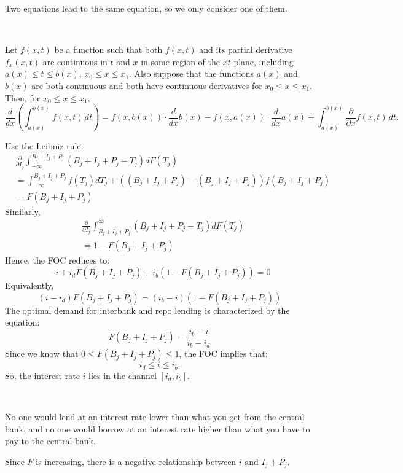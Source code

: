 Two equations lead to the same equation, so we only consider one of them.
\begin{theorem}
    \ 
    
    Let $f(x, t)$ be a function such that both $f(x, t)$ and 
    its partial derivative $f_x(x, t)$ are continuous in $t$ and 
    $x$ in some region of the $xt$-plane, 
    including $a(x) \leq t \leq b(x)$, $x_0 \leq x \leq x_1$. 
    Also suppose that the functions $a(x)$ and $b(x)$ are both continuous 
    and both have continuous derivatives for $x_0 \leq x \leq x_1$. 
    Then, for $x_0 \leq x \leq x_1$,
    \[
    \frac{d}{dx} \left( \int_{a(x)}^{b(x)} f(x, t) \, dt \right) = f(x, b(x)) \cdot \frac{d}{dx} b(x) - f(x, a(x)) \cdot \frac{d}{dx} a(x) + \int_{a(x)}^{b(x)} \frac{\partial}{\partial x} f(x, t) \, dt.
    \]
\end{theorem}

Use the Leibniz rule:
\begin{align*}
    & \frac{\partial}{\partial I_j} \int_{-\infty}^{B_j + I_j + P_j} (B_j + I_j + P_j - T_j) dF(T_j) \\
    &= \int_{-\infty}^{B_j + I_j + P_j} f(T_j)d T_j + \left((B_j + I_j + P_j) - (B_j + I_j + P_j)\right)f(B_j + I_j + P_j) \\
    &= F(B_j + I_j + P_j) 
\end{align*}
Similarly,
\begin{align*}
    & \frac{\partial}{\partial I_j} \int_{B_j + I_j + P_j}^{\infty} (B_j + I_j + P_j - T_j) dF(T_j) \\
    &= 1 - F(B_j + I_j + P_j)
\end{align*}
Hence, the FOC reduces to:
\[
-i + i_d F(B_j + I_j + P_j) + i_b (1 - F(B_j + I_j + P_j)) = 0
\]
Equivalently,
\[
(i - i_d)F(B_j + I_j + P_j) = (i_b - i)(1 - F(B_j + I_j + P_j))
\]
The optimal demand for interbank and repo lending is characterized by the equation: 
\[
F(B_j + I_j + P_j) = \frac{i_b - i}{i_b - i_d}
\]
Since we know that $0 \leq F(B_j + I_j + P_j) \leq 1$, the FOC implies that:
\[i_d \leq i \leq i_b.\]
So, the interest rate $i$ lies in the channel $[i_d, i_b]$.
\begin{note}
    \ 

    No one would lend at an interest rate lower than what you get from the central bank,
    and no one would borrow at an interest rate higher than what you have to pay to the central bank.
\end{note}

Since $F$ is increasing, there is a negative relationship between $i \text{ and } I_j + P_j.$


